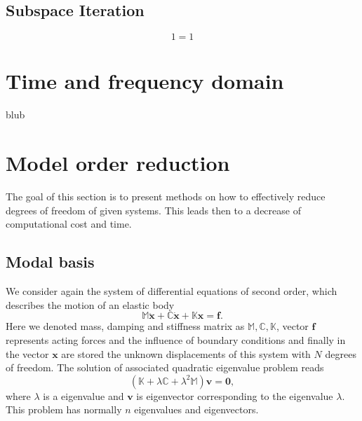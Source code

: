 \documentclass[conference]{journal}%
\newcommand{\bb}[1]{\mathbb{#1}}
\newcommand{\B}[1]{\mathbf{#1}}
\newcommand{\Bx}{\B{x}}
\newcommand{\Bv}{\B{v}}
\begin{document}
	\subsection*{Subspace Iteration}
	\begin{equation}
	1=1
	\end{equation}
	
	
	
	
	
	
	\section{Time and frequency domain}
	blub
	
	\section{Model order reduction}
	The goal of this section is to present methods on how to effectively reduce degrees of freedom of given systems. This leads then to a decrease of computational cost and time.
	
	\subsection{Modal basis}
	We consider again the system of differential equations of second order, which describes the motion of an elastic body
	\begin{equation} \label{eq:3system}
	\bb{M} \ddot{\Bx} + \bb{C} \dot{\Bx} + \bb{K} \Bx = \B{f}.
	\end{equation}
	Here we denoted mass, damping and stiffness matrix as $\bb{M}, \bb{C}, \bb{K}$, vector $\B{f}$ represents acting forces and the influence of boundary conditions and finally in the vector $\Bx$ are stored the unknown displacements of this system with $N$ degrees of freedom. The solution of associated quadratic eigenvalue problem reads
	\begin{equation} \label{eq:3eigs}
	(\bb{K} + \lambda \bb{C} + \lambda^2 \bb{M}) \Bv = \B{0},
	\end{equation}
	where $\lambda$ is a eigenvalue and $\B{v}$ is eigenvector corresponding to the eigenvalue $\lambda$. This problem has normally $n$ eigenvalues and eigenvectors. 
	
\end{document}
